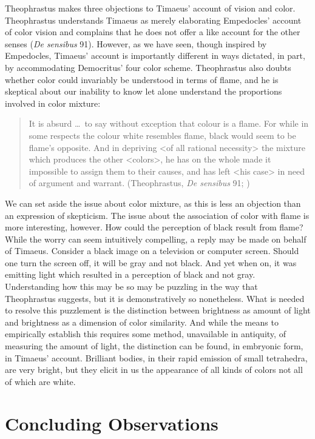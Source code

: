 Theophrastus makes three objections to Timaeus' account of vision and color. Theo\-phrastus understands Timaeus as merely elaborating Empedocles' account of color vision and complains that he does not offer a like account for the other senses (\emph{De sensibus} 91). However, as we have seen, though inspired by Empedocles, Timaeus' account is importantly different in ways dictated, in part, by accommodating Democritus' four color scheme. Theophrastus also doubts whether color could invariably be understood in terms of flame, and he is skeptical about our inability to know let alone understand the proportions involved in color mixture:
\begin{quote}
	It is absurd \ldots\ to say without exception that colour is a flame. For while in some respects the colour white resembles flame, black would seem to be flame's opposite. And in depriving <of all rational necessity> the mixture which produces the other <colors>, he has on the whole made it impossible to assign them to their causes, and has left <his case> in need of argument and warrant. (Theophrastus, \emph{De sensibus} 91; \citealt[149--50]{Stratton:1917vn})
\end{quote}
We can set aside the issue about color mixture, as this is less an objection than an expression of skepticism. The issue about the association of color with flame is more interesting, however. How could the perception of black result from flame? While the worry can seem intuitively compelling, a reply may be made on behalf of Timaeus. Consider a black image on a television or computer screen. Should one turn the screen off, it will be gray and not black. And yet when on, it was emitting light which resulted in a perception of black and not gray. Understanding how this may be so may be puzzling in the way that Theophrastus suggests, but it is demonstratively so nonetheless. What is needed to resolve this puzzlement is the distinction between brightness as amount of light and brightness as a dimension of color similarity. And while the means to empirically establish this requires some method, unavailable in antiquity, of measuring the amount of light, the distinction can be found, in embryonic form, in Timaeus' account. Brilliant bodies, in their rapid emission of small tetrahedra, are very bright, but they elicit in us the appearance of all kinds of colors not all of which are white.


\section{Concluding Observations} %
\label{sec:concluding_observations_pp}

